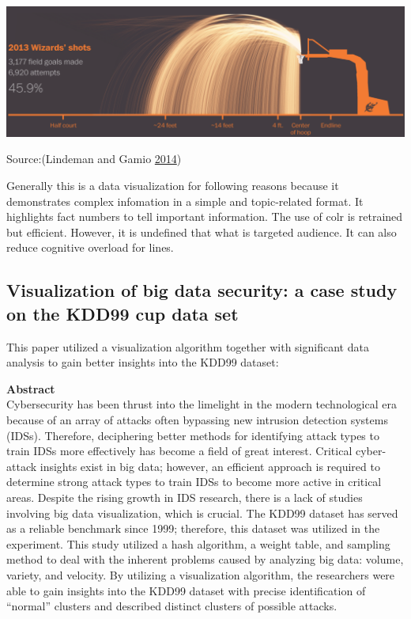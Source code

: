 \documentclass[]{book}
\begin{document}
\includegraphics{images/wizards_shooting.png}

Source:(Lindeman and Gamio \protect\hyperlink{ref-basketball}{2014})

Generally this is a data visualization for following reasons because it demonstrates complex infomation in a simple and topic-related format. It highlights fact numbers to tell important information. The use of colr is retrained but efficient. However, it is undefined that what is targeted audience. It can also reduce cognitive overload for lines.

\hypertarget{visualization-of-big-data-security-a-case-study-on-the-kdd99-cup-data-set}{%
\subsection{Visualization of big data security: a case study on the KDD99 cup data set}\label{visualization-of-big-data-security-a-case-study-on-the-kdd99-cup-data-set}}

This paper utilized a visualization algorithm together with significant data analysis to gain better insights into the KDD99 dataset:

\textbf{Abstract}\\
Cybersecurity has been thrust into the limelight in the modern technological era because of an array of attacks often bypassing new intrusion detection systems (IDSs). Therefore, deciphering better methods for identifying attack types to train IDSs more effectively has become a field of great interest. Critical cyber-attack insights exist in big data; however, an efficient approach is required to determine strong attack types to train IDSs to become more active in critical areas. Despite the rising growth in IDS research, there is a lack of studies involving big data visualization, which is crucial. The KDD99 dataset has served as a reliable benchmark since 1999; therefore, this dataset was utilized in the experiment. This study utilized a hash algorithm, a weight table, and sampling method to deal with the inherent problems caused by analyzing big data: volume, variety, and velocity. By utilizing a visualization algorithm, the researchers were able to gain insights into the KDD99 dataset with precise identification of ``normal'' clusters and described distinct clusters of possible attacks.
\end{document}
